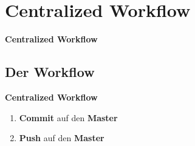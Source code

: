 

\section{Centralized Workflow}\label{sec:centralized-workflow}
\begin{frame}[c]
    \centering
    \Large
    \textbf{Centralized Workflow}
\end{frame}

\subsection{Der Workflow}\label{subsec:der-workflow}
\begin{frame}[c]
    \slidehead
    \centering
    \large
    \textbf{Centralized Workflow}
    \vspace{1em}
    \begin{enumerate}[<+->]
        \item \textbf{Commit} auf den \textbf{Master}
        \item \textbf{Push} auf den \textbf{Master}
    \end{enumerate}
\end{frame}

